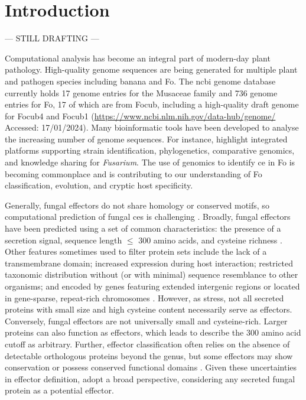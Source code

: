\section{Introduction}

--- STILL DRAFTING ---

Computational analysis has become an integral part of modern-day plant pathology. High-quality genome sequences are being generated for multiple plant and pathogen species including banana and \ac{Fo}. The \ac{ncbi} genome database currently holds 17 genome entries for the Musaceae family and 736 genome entries for \ac{Fo}, 17 of which are from \ac{Focub}, including a high-quality draft genome for \ac{Focub4} \parencite{Warmington2019} and \ac{Focub1} \parencite{Asai2019} (\href{https://www.ncbi.nlm.nih.gov/data-hub/genome/}{https://www.ncbi.nlm.nih.gov/data-hub/genome/} Accessed: 17/01/2024). Many bioinformatic tools have been developed to analyse the increasing number of genome sequences. For instance, \textcite{Park2010} highlight integrated platforms supporting strain identification, phylogenetics, comparative genomics, and knowledge sharing for \textit{Fusarium}. The use of genomics to identify \acf{ce} in \ac{Fo} is becoming commonplace and is contributing to our understanding of \ac{Fo} classification, evolution, and cryptic host specificity. 

Generally, fungal effectors do not share homology or conserved motifs, so computational prediction of fungal \acp{ce} is challenging \parencite{Sperschneider2022, Todd2022}. Broadly, fungal effectors have been predicted using a set of common characteristics: the presence of a secretion signal, sequence length $\leq$ 300 amino acids, and cysteine richness \parencite{Sperschneider2015}. Other features sometimes used to filter protein sets include the lack of a transmembrane domain; increased expression during host interaction; restricted taxonomic distribution without (or with minimal) sequence resemblance to other organisms; and encoded by genes featuring extended intergenic regions or located in gene-sparse, repeat-rich chromosomes \parencite{Dalio2018, Todd2022}. However, as \textcite{LoPresti2015, Sperschneider2015} stress, not all secreted proteins with small size and high cysteine content necessarily serve as effectors. Conversely, fungal effectors are not universally small and cysteine-rich. Larger proteins can also function as effectors, which leads \textcite{LoPresti2015} to describe the 300 amino acid cutoff as arbitrary. Further, effector classification often relies on the absence of detectable orthologous proteins beyond the genus, but some effectors may show conservation or possess conserved functional domains \parencite{Jonge2010, Djamei2011, Mentlak2012}. Given these uncertainties in effector definition, \textcite{LoPresti2015} adopt a broad perspective, considering any secreted fungal protein as a potential effector. 

